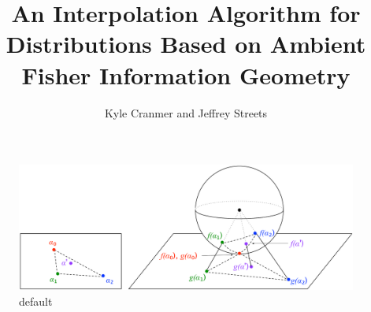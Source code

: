 \documentclass[11pt, oneside]{article}   	%
\title{An Interpolation Algorithm for Distributions Based on Ambient Fisher Information Geometry}
\author{Kyle Cranmer and Jeffrey Streets}
\begin{document}
\maketitle


\begin{figure}[htbp]
\begin{center}
\includegraphics[width=\textwidth]{GnomonicProjection.pdf}

\caption{default}
\label{default}
\end{center}
\end{figure}
\end{document}

